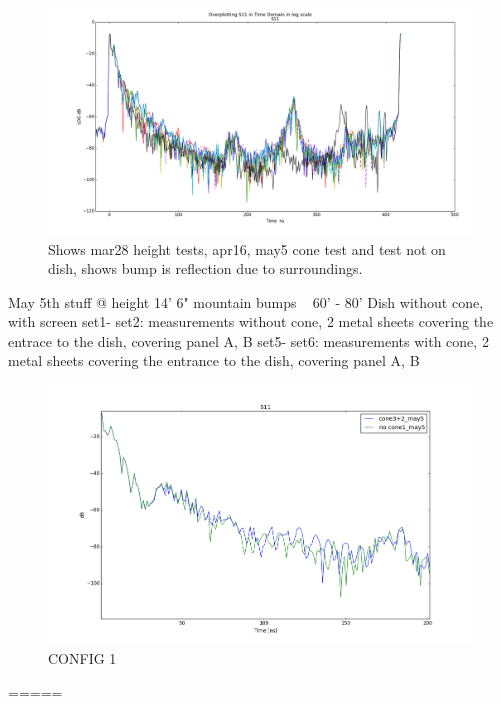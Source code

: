 \documentclass[preprint]{aastex}  %
\begin{document}
\begin{figure}[H]
	\begin{center}
	\includegraphics[width =\textwidth]{./reflectometry_plots/Mar28/s11all-mar28mix17set1}
	\caption{Shows mar28 height tests, apr16, may5 cone test and test not on dish, shows bump is reflection due to surroundings.
\label{Fig:} }
	\end{center}
\end{figure}

May 5th stuff
@ height 14' 6"
mountain bumps ~ 60' - 80'
Dish without cone, with screen
set1- set2: measurements without cone, 2 metal sheets covering the entrace to the dish, covering panel A, B
set5- set6: measurements with cone, 2 metal sheets covering the entrance to the dish, covering panel A, B

\begin{figure}[H]
	\begin{center}
	\includegraphics[width =\textwidth]{./reflectometry_plots/May5/set1vsset3zoom}
	\caption{CONFIG 1
\label{Fig:} }
	\end{center}
\end{figure}
=====
\end{document}
